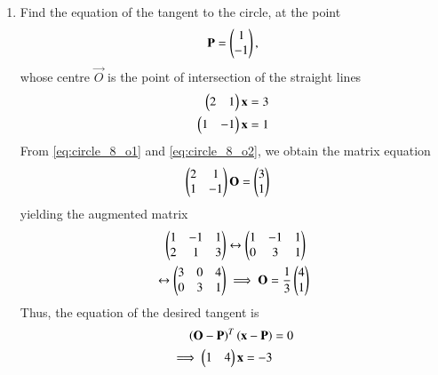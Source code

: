 \documentclass[journal,12pt,twocolumn]{IEEEtran}
\begin{document}
\begin{enumerate}[label=\arabic*]
\item Find the equation of the tangent to the circle, at the point
\begin{equation}
\mathbf{P}=\begin{pmatrix}1\\ -1\end{pmatrix},
\end{equation}
whose centre $\vec{O}$ is the point of intersection of the straight lines
\begin{align} 
\label{eq:circle_8_o1}
\begin{pmatrix}2 & 1\end{pmatrix}\mathbf{x} &= 3
\\
\begin{pmatrix}1 & -1\end{pmatrix}\mathbf{x} &= 1
\label{eq:circle_8_o2}
\end{align} 
\solution From \eqref{eq:circle_8_o1} and \eqref{eq:circle_8_o2}, we obtain the matrix equation
\begin{align} 
\begin{pmatrix}2 & 1\\1 & -1\end{pmatrix}\mathbf{O} &= \begin{pmatrix}3 \\ 1\end{pmatrix}
\end{align} 
yielding the augmented matrix
\begin{align} 
\begin{pmatrix}1 & -1 & 1\\2 & 1 & 3\end{pmatrix}&\leftrightarrow\begin{pmatrix}1 & -1 & 1\\0 & 3 & 1\end{pmatrix}
\nonumber \\
\leftrightarrow\begin{pmatrix}3 & 0 & 4\\0 & 3 & 1\end{pmatrix}&\implies \mathbf{O} = \frac{1}{3}\begin{pmatrix}4 \\ 1\end{pmatrix}
\end{align} 
%
Thus, the equation of the desired tangent is 
\begin{align} 
\left(\mathbf{O}-\mathbf{P}\right)^T\left(\mathbf{x}-\mathbf{P}\right) &= 0
\nonumber \\
\implies
\begin{pmatrix}1 & 4\end{pmatrix}\mathbf{x}=-3
\end{align} 
\end{enumerate}
\end{document}
